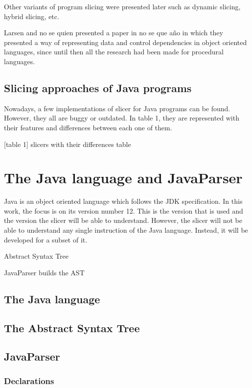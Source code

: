 \documentclass[a4paper]{article}
\begin{document}
Other variants of program slicing were presented later such as dynamic slicing, hybrid slicing, etc. 

Larsen and no se quien presented a paper in no se que año in which they presented a way of representing data and control dependencies in object oriented languages, since until then all the research had been made for procedural languages. 

\subsection{Slicing approaches of Java programs}

Nowadays, a few implementations of slicer for Java programs can be found. However, they all are buggy or outdated. In table 1, they are represented with their features and differences between each one of them. 

[table 1]
slicers with their differences table

\section{The Java language and JavaParser}

Java is an object oriented language which follows the JDK specification. In this work, the focus is on its version number 12. This is the version that is used and the version the slicer will be able to understand. However, the slicer will not be able to understand any single instruction of the Java language. Instead, it will be developed for a subset of it.

Abstract Syntax Tree

JavaParser builds the AST 

\subsection{The Java language}

\subsection{The Abstract Syntax Tree}

\subsection{JavaParser}

\subsubsection{Declarations}
\end{document}
